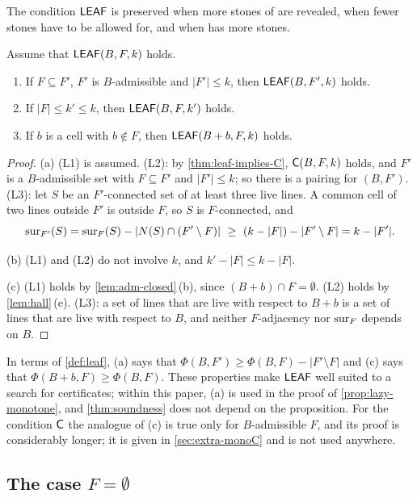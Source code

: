The condition $\mathsf{LEAF}$ is preserved when more stones of \Maker{} are revealed, when fewer stones
have to be allowed for, and when \Breaker{} has more stones.

\begin{proposition}\label{prop:leaf-monotone}
Assume that $\mathsf{LEAF}(B,F,k)$ holds.
\begin{enumerate}[label=\textup{(\alph*)}]
\item If $F\subseteq F'$, $F'$ is $B$-admissible and $|F'|\le k$, then $\mathsf{LEAF}(B,F',k)$ holds.
\item If $|F|\le k'\le k$, then $\mathsf{LEAF}(B,F,k')$ holds.
\item If $b$ is a cell with $b\notin F$, then $\mathsf{LEAF}(B+b,F,k)$ holds.
\end{enumerate}
\end{proposition}

\begin{proof}
(a) (L1) is assumed. (L2): by \cref{thm:leaf-implies-C}, $\mathsf{C}(B,F,k)$ holds, and $F'$ is a $B$-admissible
set with $F\subseteq F'$ and $|F'|\le k$; so there is a pairing for $(B,F')$. (L3): let $S$ be an
$F'$-connected set of at least three live lines. A common cell of two lines outside $F'$ is outside
$F$, so $S$ is $F$-connected, and
\[
  \operatorname{sur}_{F'}(S)=\operatorname{sur}_F(S)-|N(S)\cap(F'\setminus F)|\ \ge\ (k-|F|)-|F'\setminus F|=k-|F'| .
\]

(b) (L1) and (L2) do not involve $k$, and $k'-|F|\le k-|F|$.

(c) (L1) holds by \cref{lem:adm-closed}\,(b), since $(B+b)\cap F=\emptyset$. (L2) holds by
\cref{lem:hall}\,(e). (L3): a set of lines that are live with respect to $B+b$ is a set of lines that are
live with respect to $B$, and neither $F$-adjacency nor $\operatorname{sur}_F$ depends on $B$.
\end{proof}

In terms of \cref{def:leaf}, (a) says that $\Phi(B,F')\ge\Phi(B,F)-|F'\setminus F|$ and (c) says that
$\Phi(B+b,F)\ge\Phi(B,F)$. These properties make $\mathsf{LEAF}$ well suited to a search for certificates; within
this paper, (a) is used in the proof of \cref{prop:lazy-monotone}, and \cref{thm:soundness} does not
depend on the proposition. For the condition $\mathsf{C}$ the analogue of (c) is true only for $B$-admissible
$F$, and its proof is considerably longer; it is given in \cref{sec:extra-monoC} and is not used
anywhere.

\subsection{The case \texorpdfstring{$F=\emptyset$}{F empty}}\label{ssec:Fempty}

